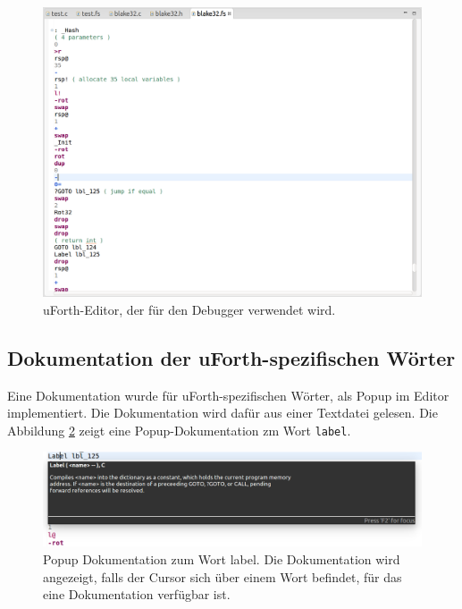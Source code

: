 \begin{figure}[H]
	\centering
		\includegraphics[scale=0.4]{fortheditor/fortheditor.png}
		\caption{uForth-Editor, der für den Debugger verwendet wird.}
		\label{fig:fortheditor}
\end{figure}

\newpage

\subsection{Dokumentation der uForth-spezifischen Wörter}
Eine Dokumentation wurde für uForth-spezifischen Wörter, als Popup im Editor implementiert. Die Dokumentation wird dafür aus einer Textdatei gelesen. Die Abbildung \ref{fig:docpopup} zeigt eine Popup-Dokumentation zm Wort \verb!label!.

\begin{figure}[H]
	\centering
		\includegraphics[scale=0.4]{fortheditor/doc.png}
		\caption{Popup Dokumentation zum Wort label. Die Dokumentation wird angezeigt, falls der Cursor sich über einem Wort befindet, für das eine Dokumentation verfügbar ist.}
		\label{fig:docpopup}
\end{figure}

